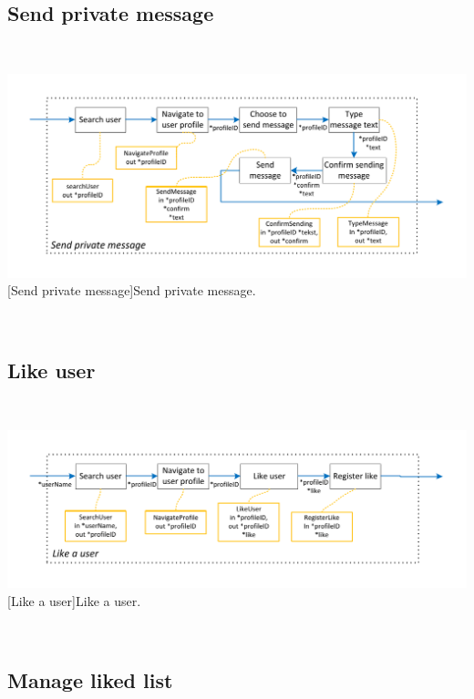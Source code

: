 \documentclass[11pt, a4paper,svglistings,oneside]{book}
\begin{document}
\subsection{Send private message}

$\;$ \\
\noindent\begin{minipage}{\textwidth}
    \centering
   \includegraphics[scale=1]{nav_SendPrivateMessage.pdf}
 [Send private message]{Send private message.}
\end{minipage}
$\;$ \\ 

\subsection{Like user}

$\;$ \\
\noindent\begin{minipage}{\textwidth}
    \centering
   \includegraphics[scale=1]{nav_LikeUser.pdf}
 [Like a user]{Like a user.}
\end{minipage}
$\;$ \\ 

\subsection{Manage liked list}
\end{document}
